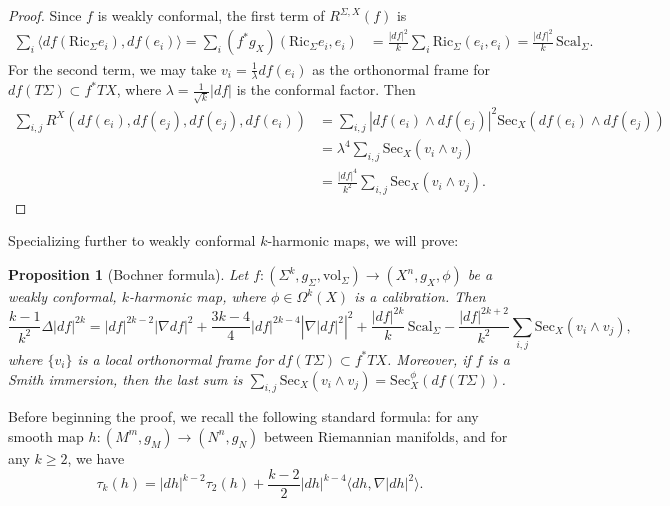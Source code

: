 \documentclass[11pt]{article}
\newcommand{\vol}{\mathrm{vol}}
\newtheorem{prop}[thm]{Proposition}
\theoremstyle{definition}
\numberwithin{equation}{section}
\begin{document}
\begin{proof} Since $f$ is weakly conformal, the first term of $R^{\Sigma, X}(f)$ is
\begin{align*}
 \sum_i \langle df(\mathrm{Ric}_\Sigma e_i), df(e_i) \rangle = \sum_{i} (f^*g_X)(\mathrm{Ric}_\Sigma e_i, e_i) & = \frac{|df|^2}{k} \sum_i \mathrm{Ric}_\Sigma(e_i, e_i) = \frac{|df|^2}{k}\,\mathrm{Scal}_\Sigma.
 \end{align*}
 For the second term, we may take $v_i = \frac{1}{\lambda} df(e_i)$ as the orthonormal frame for $df(T\Sigma) \subset f^*TX$, where $\lambda = \frac{1}{\sqrt{k}}|df|$ is the conformal factor.  Then
 \begin{align*}
\sum_{i,j} R^X( df(e_i), df(e_j), df(e_j), df(e_i)) & = \sum_{i,j} \left| df(e_i) \wedge df(e_j) \right|^2 \mathrm{Sec}_X(df(e_i) \wedge df(e_j)) \\
& = \lambda^4 \sum_{i,j} \mathrm{Sec}_X(v_i \wedge v_j) \\
& = \frac{|df|^4}{k^2}\sum_{i,j} \mathrm{Sec}_X(v_i \wedge v_j).
\end{align*}
\end{proof}

Specializing further to weakly conformal $k$-harmonic maps, we will prove:

\begin{prop}[Bochner formula] \label{prop:Bochner} Let $f \colon (\Sigma^k, g_\Sigma, \vol_\Sigma) \to (X^n, g_X, \phi)$ be a weakly conformal, $k$-harmonic map, where $\phi \in \Omega^k(X)$ is a calibration.  Then
\begin{equation}
\frac{k-1}{k^2} \Delta |df|^{2k} = |df|^{2k-2} |\nabla df|^2 + \frac{3k-4}{4} \left| df \right|^{2k-4} \left| \nabla |df|^2 \right|^2 + \frac{|df|^{2k}}{k}\,\mathrm{Scal}_\Sigma - \frac{|df|^{2k+2}}{k^2} \sum_{i,j} \mathrm{Sec}_X(v_i \wedge v_j),
\end{equation}
where $\{v_i\}$ is a local orthonormal frame for $df(T\Sigma) \subset f^*TX$.  Moreover, if $f$ is a Smith immersion, then the last sum is $\sum_{i,j} \mathrm{Sec}_X(v_i \wedge v_j) = \mathrm{Sec}^\phi_X( df(T\Sigma))$.
\end{prop}

Before beginning the proof, we recall the following standard formula: for any smooth map $h \colon (M^m, g_M) \to (N^n, g_N)$ between Riemannian manifolds, and for any $k \geq 2$, we have
\begin{equation} \label{kTension2Tension}
\tau_k(h) = |dh|^{k-2} \tau_2(h) + \frac{k-2}{2} |dh|^{k-4} \langle dh, \nabla |dh|^2 \rangle.
\end{equation}
\end{document}
